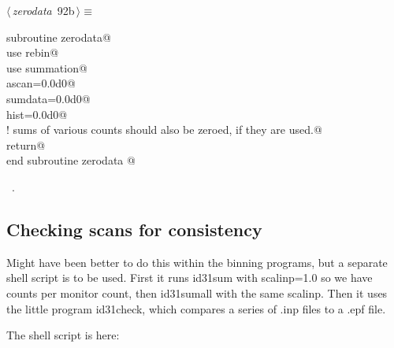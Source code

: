 \documentclass[10pt,a4paper,notitlepage]{article}
\begin{document}
\begin{flushleft} \small
\begin{minipage}{\linewidth}\label{scrap116}\raggedright\small
{} $\langle\,${\it zerodata}\nobreak\ {\footnotesize {92b}}$\,\rangle\equiv$
\vspace{-1ex}
\begin{list}{}{} \item
\mbox{}\verb@      subroutine zerodata@\\
\mbox{}\verb@      use rebin@\\
\mbox{}\verb@      use summation@\\
\mbox{}\verb@      ascan=0.0d0@\\
\mbox{}\verb@      sumdata=0.0d0@\\
\mbox{}\verb@      hist=0.0d0@\\
\mbox{}\verb@      ! sums of various counts should also be zeroed, if they are used.@\\
\mbox{}\verb@      return@\\
\mbox{}\verb@      end subroutine zerodata                                                @{\NWsep}
\end{list}
\vspace{-1.5ex}
\footnotesize
\begin{list}{}{\setlength{\itemsep}{-\parsep}\setlength{\itemindent}{-\leftmargin}}
\item \NWtxtMacroRefIn\ .

\item{}
\end{list}
\end{minipage}\vspace{4ex}
\end{flushleft}
\subsection{Checking scans for consistency}

Might have been better to do this within the binning programs, but 
a separate shell script is to be used. First it runs id31sum with scalinp=1.0
so we have counts per monitor count, then id31sumall with the same scalinp.
Then it uses the little program id31check, which compares a series of
.inp files to a .epf file. 

The shell script is here:
\end{document}
